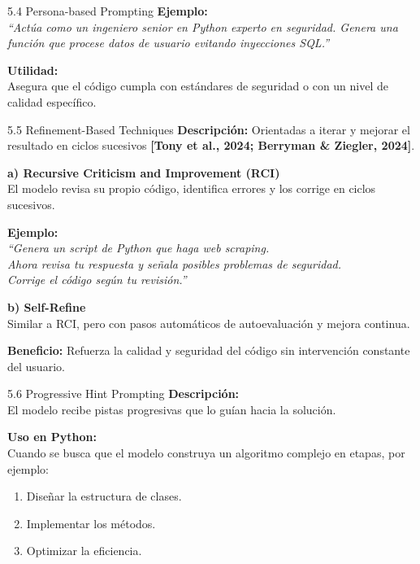 \documentclass[xcolor=svgnames,t]{beamer}
\newcommand{\tightitem}{\itemsep4pt\parskip0pt\parsep0pt}
\begin{document}
{\begin{frame}{5.4 Persona-based Prompting}
\medskip
\textbf{Ejemplo:}\\
\textit{“Actúa como un ingeniero senior en Python experto en seguridad. Genera una función que procese datos de usuario evitando inyecciones SQL.”}

\medskip
\textbf{Utilidad:}\\
Asegura que el código cumpla con estándares de seguridad o con un nivel de calidad específico.
\end{frame}

\begin{frame}{5.5 Refinement-Based Techniques}
\justifying
\textbf{Descripción:}
Orientadas a iterar y mejorar el resultado en ciclos sucesivos \textbf{[Tony et al., 2024; Berryman \& Ziegler, 2024]}.

\medskip
\textbf{a) Recursive Criticism and Improvement (RCI)}\\
El modelo revisa su propio código, identifica errores y los corrige en ciclos sucesivos.

\medskip
\textbf{Ejemplo:}\\
\textit{“Genera un script de Python que haga web \textit{scraping}.\\
Ahora revisa tu respuesta y señala posibles problemas de seguridad.\\
Corrige el código según tu revisión.”}

\medskip
\textbf{b) Self-Refine}\\
Similar a RCI, pero con pasos automáticos de autoevaluación y mejora continua.

\medskip
\textbf{Beneficio:}
Refuerza la calidad y seguridad del código sin intervención constante del usuario.
\end{frame}

\begin{frame}{5.6 Progressive Hint Prompting}
\justifying
\textbf{Descripción:}\\
El modelo recibe pistas progresivas que lo guían hacia la solución.

\medskip
\textbf{Uso en Python:}\\
Cuando se busca que el modelo construya un algoritmo complejo en etapas, por ejemplo:
\begin{enumerate}\tightitem
  \item Diseñar la estructura de clases.
  \item Implementar los métodos.
  \item Optimizar la eficiencia.
\end{enumerate}


\end{frame}}
\end{document}
